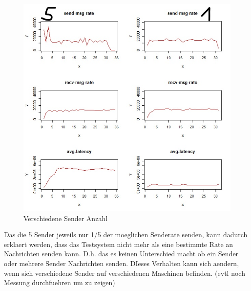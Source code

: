 \begin{figure}
\center
  \includegraphics[width=1\textwidth]{images/varyingProducerMaxThroughput.jpg}
  \caption{Verschiedene Sender Anzahl}
  \label{img:varyingProducerMaxThroughput}
\end{figure}
Das die 5 Sender jeweils nur 1/5 der moeglichen Senderate senden, kann dadurch erklaert werden, dass das Testsystem nicht mehr als eine bestimmte Rate an Nachrichten senden kann. D.h. das es keinen Unterschied macht ob ein Sender oder mehrere Sender Nachrichten senden. DIeses Verhalten kann sich aendern, wenn sich verschiedene Sender auf verschiedenen Maschinen befinden. (evtl noch Messung durchfuehren um zu zeigen) 




